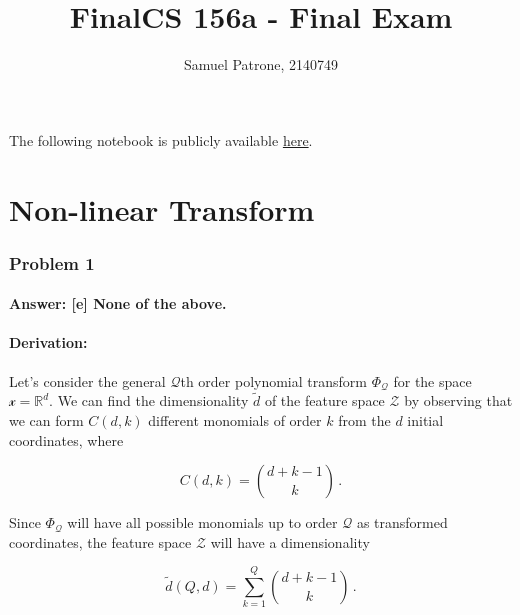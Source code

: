 \documentclass[11pt]{article}
\title{Final}
\begin{document}
    \title{CS 156a - Final Exam}
    \author{Samuel Patrone, 2140749}
    \maketitle
    

The following notebook is publicly available
\href{https://github.com/spatrone/CS156A-Caltech.git}{here}.

\tableofcontents

    \hypertarget{non-linear-transform}{%
\part{Non-linear Transform}\label{non-linear-transform}}

\hypertarget{problem-1}{%
\section{Problem 1}\label{problem-1}}

\hypertarget{answer-e-none-of-the-above.}{%
\subsection{Answer: {[}e{]} None of the
above.}\label{answer-e-none-of-the-above.}}

\hypertarget{derivation}{%
\subsection{Derivation:}\label{derivation}}

Let's consider the general \(\mathcal{Q}\)th order polynomial transform
\(\Phi_\mathcal{Q}\) for the space \(\mathcal{x}=\mathbb{R}^d\). We can
find the dimensionality \(\tilde{d}\) of the feature space
\(\mathcal{Z}\) by observing that we can form \(C(d,k)\) different
monomials of order \(k\) from the \(d\) initial coordinates, where

\begin{equation}
C(d,k)={d+k-1 \choose k}\,.
\end{equation}

Since \(\Phi_\mathcal{Q}\) will have all possible monomials up to order
\(\mathcal{Q}\) as transformed coordinates, the feature space
\(\mathcal{Z}\) will have a dimensionality

\begin{equation}
\tilde{d}(Q,d)=\sum^Q_{k=1}{d+k-1 \choose k}\,.
\end{equation}
\end{document}
